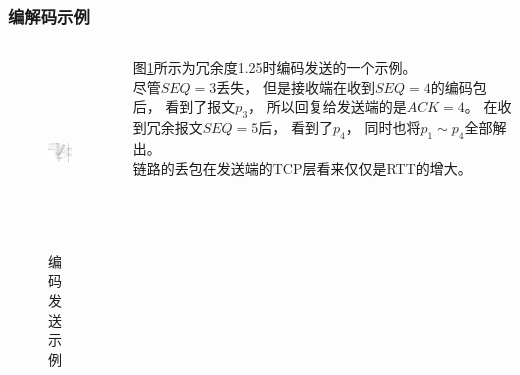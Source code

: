 %	
\begin{frame}[t]
	\frametitle{编解码示例}
 	\begin{columns}[t,onlytextwidth]
    	\hspace{-2.0em}
    	\begin{column}{0.55\textwidth}
    		\vspace{-2em}
    		\begin{figure}
    			\includegraphics[height=5cm]{figures/encodingexp.eps}
    			\caption{编码发送示例}
    			\label{fig:codingexp}
    		\end{figure}
    	\end{column}
    	\hspace{2.5em}
    	\begin{column}{0.45\textwidth}
    		图\ref{fig:codingexp}所示为冗余度1.25时编码发送的一个示例。\\
    		\vspace{1em}
    		尽管$SEQ=3$丢失，
    		但是接收端在收到$SEQ=4$的编码包后，
    		看到了报文$p_3$，
    		所以回复给发送端的是$ACK=4$。
    		在收到冗余报文$SEQ=5$后，
    		看到了$p_4$，
    		同时也将$p_1 \sim p_4$全部解出。\\
    		\vspace{1em}
    		链路的丢包在发送端的TCP层看来仅仅是RTT的增大。
    	\end{column}
	\end{columns}
\end{frame}

